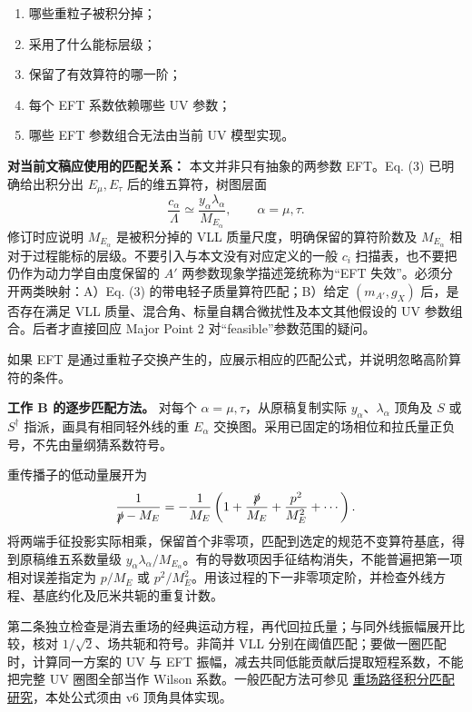 \documentclass[
]{article}
\providecommand{\tightlist}{%
  \setlength{\itemsep}{0pt}\setlength{\parskip}{0pt}}
\begin{document}
\begin{enumerate}
\def\labelenumi{\arabic{enumi}.}
\tightlist
\item
  哪些重粒子被积分掉；
\item
  采用了什么能标层级；
\item
  保留了有效算符的哪一阶；
\item
  每个 EFT 系数依赖哪些 UV 参数；
\item
  哪些 EFT 参数组合无法由当前 UV 模型实现。
\end{enumerate}

\textbf{对当前文稿应使用的匹配关系：} 本文并非只有抽象的两参数 EFT。Eq.
(3) 已明确给出积分出 \(E_\mu,E_\tau\) 后的维五算符，树图层面 \[
\frac{c_\alpha}{\Lambda}\simeq\frac{y_\alpha\lambda_\alpha}{M_{E_\alpha}},\qquad \alpha=\mu,\tau.
\] 修订时应说明 \(M_{E_\alpha}\) 是被积分掉的 VLL
质量尺度，明确保留的算符阶数及 \(M_{E_\alpha}\)
相对于过程能标的层级。不要引入与本文没有对应定义的一般 \(c_i\)
扫描表，也不要把仍作为动力学自由度保留的 \(A'\)
两参数现象学描述笼统称为``EFT 失效''。必须分开两类映射：A）Eq. (3)
的带电轻子质量算符匹配；B）给定 \((m_{A'},g_X)\) 后，是否存在满足 VLL
质量、混合角、标量自耦合微扰性及本文其他假设的 UV
参数组合。后者才直接回应 Major Point 2 对``feasible''参数范围的疑问。

如果 EFT
是通过重粒子交换产生的，应展示相应的匹配公式，并说明忽略高阶算符的条件。

\textbf{工作 B 的逐步匹配方法。} 对每个
\(\alpha=\mu,\tau\)，从原稿复制实际 \(y_\alpha\)、\(\lambda_\alpha\)
顶角及 \(S\) 或 \(S^\dagger\) 指派，画具有相同轻外线的重 \(E_\alpha\)
交换图。采用已固定的场相位和拉氏量正负号，不先由量纲猜系数符号。

重传播子的低动量展开为 \[
\frac1{\slashed p-M_E}
=-\frac1{M_E}\left(1+\frac{\slashed p}{M_E}
+\frac{p^2}{M_E^2}+\cdots\right).
\]
将两端手征投影实际相乘，保留首个非零项，匹配到选定的规范不变算符基底，得到原稿维五系数量级
\(y_\alpha\lambda_\alpha/M_{E_\alpha}\)。有的导数项因手征结构消失，不能普遍把第一项相对误差指定为
\(p/M_E\) 或
\(p^2/M_E^2\)。用该过程的下一非零项定阶，并检查外线方程、基底约化及厄米共轭的重复计数。

第二条独立检查是消去重场的经典运动方程，再代回拉氏量；与同外线振幅展开比较，核对
\(1/\sqrt2\)、场共轭和符号。非简并 VLL
分别在阈值匹配；要做一圈匹配时，计算同一方案的 UV 与 EFT
振幅，减去共同低能贡献后提取短程系数，不能把完整 UV 圈图全部当作 Wilson
系数。一般匹配方法可参见
\href{https://doi.org/10.1140/epjc/s10052-021-09587-7}{重场路径积分匹配研究}，本处公式须由
v6 顶角具体实现。
\end{document}
